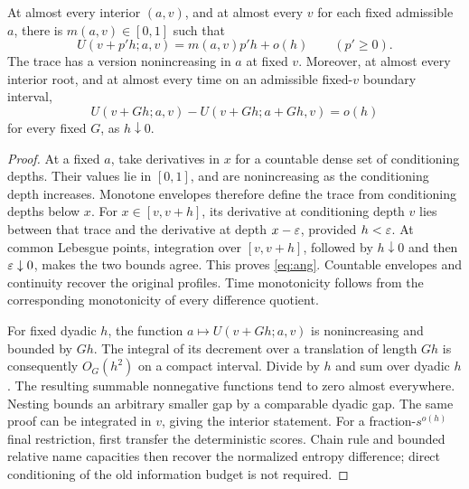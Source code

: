 \begin{lemma}
\label{names:angular-trace}
At almost every interior \((a,v)\), and at almost every \(v\) for
each fixed admissible \(a\), there is \(m(a,v)\in[0,1]\) such that
\begin{equation}
 U(v+p'h;a,v)=m(a,v)p'h+o(h)\qquad(p'\geq0).
 \tag{ang}\label{eq:ang}
\end{equation}
The trace has a version nonincreasing in \(a\) at fixed \(v\).
Moreover, at almost every interior root, and at almost every time on
an admissible fixed-\(v\) boundary interval,
\begin{equation}
 U(v+Gh;a,v)-U(v+Gh;a+Gh,v)=o(h)
 \tag{ng}\label{eq:ng}
\end{equation}
for every fixed \(G\), as \(h\downarrow0\).
\end{lemma}

\begin{proof}
At a fixed \(a\), take derivatives in \(x\) for a countable dense
set of conditioning depths. Their values lie in \([0,1]\), and
are nonincreasing as the conditioning depth increases. Monotone
envelopes therefore define the trace from conditioning depths below
\(x\). For \(x\in[v,v+h]\), its derivative at conditioning depth
\(v\) lies between that trace and the derivative at depth
\(x-\varepsilon\), provided \(h<\varepsilon\). At common Lebesgue points,
integration over \([v,v+h]\), followed by \(h\downarrow0\) and
then \(\varepsilon\downarrow0\), makes the two bounds agree. This proves
\eqref{eq:ang}. Countable envelopes and continuity recover the
original profiles. Time monotonicity follows from the corresponding
monotonicity of every difference quotient.

For fixed dyadic \(h\), the function
\(a\mapsto U(v+Gh;a,v)\) is nonincreasing and bounded by \(Gh\).
The integral of its decrement over a translation of length \(Gh\)
is consequently \(O_G(h^2)\) on a compact interval. Divide by
\(h\) and sum over dyadic \(h\). The resulting summable
nonnegative functions tend to zero almost everywhere. Nesting bounds
an arbitrary smaller gap by a comparable dyadic gap. The same proof
can be integrated in \(v\), giving the interior statement.
For a fraction-\(s^{o(h)}\) final restriction, first transfer the
deterministic scores. Chain rule and bounded relative name
capacities then recover the normalized entropy difference; direct
conditioning of the old information budget is not required.
\end{proof}

